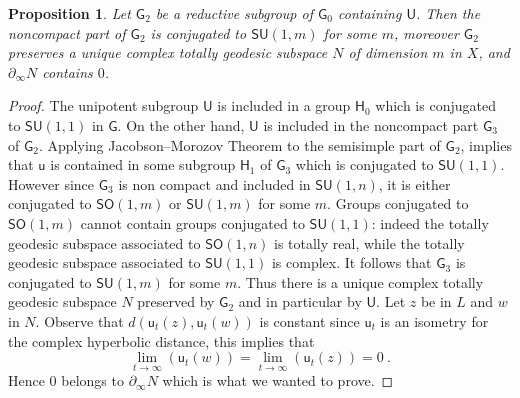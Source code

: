 \documentclass[12pt,reqno]{amsart}
\newtheorem{proposition}[theorem]{Proposition}
\newcommand{\mG}{\ms G}
\newcommand{\mH}{\ms H}
\newcommand{\ms}{\mathsf}
\newcommand{\uu}{\mathsf u}
\newcommand{\mU}{\mathsf U}
\begin{document}
\begin{proposition}\label{prop:uug2}
	Let $\mG_2$ be a reductive subgroup of $\mG_0$ containing $\mU$. Then the noncompact part of $\mG_2$ is conjugated to $\mathsf{SU}(1,m)$ for some $m$, moreover $\mG_2$ preserves a unique complex totally geodesic subspace $N$ of dimension $m$ in $X$, and $\partial_\infty N$ contains $0$. 
\end{proposition}
\begin{proof}
The unipotent subgroup $\mU$ is included in a group $\mH_0$ which is conjugated to $\mathsf{SU}(1,1)$ in $\mG$. On the other hand, $\mU$ is included in the noncompact part $\mG_3$ of $\mG_2$. Applying   Jacobson--Morozov Theorem \cite[Proposition 1, Proposition 2, §11] {Bourbaki:owAvyv1m} to the semisimple part of $\mG_2$, implies that $\uu$ is contained in some subgroup $\mH_1$ of $\mG_3$ which is conjugated to $\mathsf{SU}(1,1)$. However since $\mG_3$ is non compact and included in $\mathsf{SU}(1,n)$, it is either conjugated to $\mathsf{SO}(1,m)$ or  $\mathsf{SU}(1,m)$ for some $m$. Groups conjugated to $\mathsf{SO}(1,m)$ cannot contain groups conjugated to  $\mathsf{SU}(1,1)$: indeed the totally geodesic subspace associated to $\mathsf{SO}(1,n)$ is totally real, while the totally geodesic subspace associated to $\mathsf{SU}(1,1)$ is complex. It follows that $\mG_3$ is conjugated to  $\mathsf{SU}(1,m)$  for some $m$. Thus there is a unique complex totally geodesic subspace $N$ preserved by $\mG_2$ and in particular by $\mU$. Let $z$ be in $L$ and $w$ in $N$. Observe that $d(\uu_t(z),\uu_t(w))$  is constant since $\uu_t$ is an isometry for the complex hyperbolic distance, this implies that 
$$
\lim_{t\to\infty}(\uu_t(w))=\lim_{t\to\infty}(\uu_t(z))=0\ .
$$
Hence $0$ belongs to $\partial_\infty N$ which is what we wanted to prove.
\end{proof}
\end{document}
